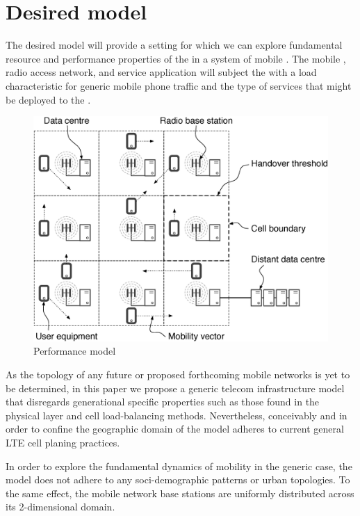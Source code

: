 \section{Desired model}

The desired model will provide a setting for which we can explore fundamental resource and performance properties of the \xcloud{} in a system of mobile \ues{}. The mobile \ues{}, radio access network, and service application will subject the \dcs{} with a load characteristic for generic mobile phone traffic and the type of services that might be deployed to the \xcloud{}.

\begin{figure}[tb]
	\centering
	\includegraphics[width=\linewidth]{desiard_model.eps} 
	\caption{Performance model}
	\label{fig:performance_model}
\end{figure}

As the topology of any future \xcloud{} or proposed forthcoming mobile networks is yet to be determined, in this paper we propose a generic telecom infrastructure model that disregards generational specific properties such as those found in the physical layer and cell load-balancing methods. Nevertheless, conceivably and in order to confine the geographic domain of the model adheres to current general LTE cell planing practices. 

In order to explore the fundamental dynamics of mobility in the generic case, the model does not adhere to any soci-demographic patterns or urban topologies. To the same effect, the mobile network base stations are uniformly distributed across its 2-dimensional domain.

